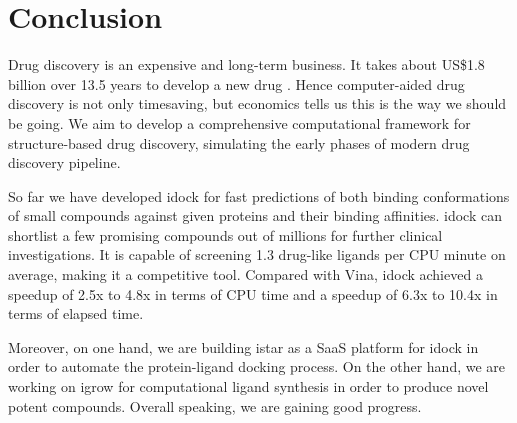 \chapter{Conclusion}

Drug discovery is an expensive and long-term business. It takes about US\$1.8 billion over 13.5 years to develop a new drug \citep{716}. Hence computer-aided drug discovery is not only timesaving, but economics tells us this is the way we should be going. We aim to develop a comprehensive computational framework for structure-based drug discovery, simulating the early phases of modern drug discovery pipeline.

So far we have developed idock for fast predictions of both binding conformations of small compounds against given proteins and their binding affinities. idock can shortlist a few promising compounds out of millions for further clinical investigations. It is capable of screening 1.3 drug-like ligands per CPU minute on average, making it a competitive tool. Compared with Vina, idock achieved a speedup of 2.5x to 4.8x in terms of CPU time and a speedup of 6.3x to 10.4x in terms of elapsed time.

Moreover, on one hand, we are building istar as a SaaS platform for idock in order to automate the protein-ligand docking process. On the other hand, we are working on igrow for computational ligand synthesis in order to produce novel potent compounds. Overall speaking, we are gaining good progress.

\chapterend